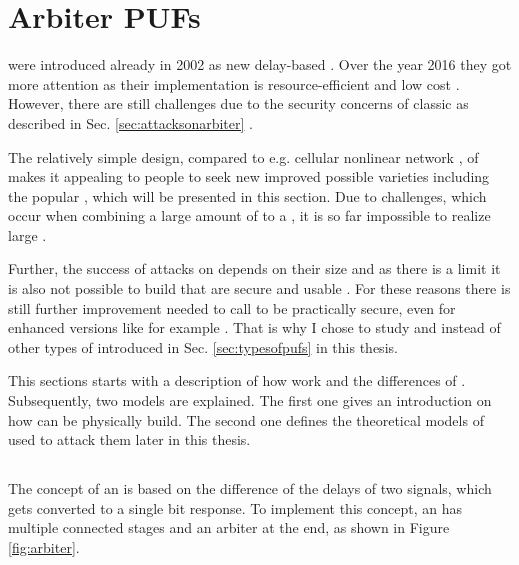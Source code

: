 \chapter{Arbiter \acsp{PUF}}
\label{cap:arbiter}

\apufs were introduced already in 2002 as new delay-based \puf \cite{Gassend2002SiliconFunctions}.
Over the year 2016 they got more attention as their implementation is resource-efficient and low cost \cite{Becker2014ActiveDesigns,Suh2007PhysicalGeneration}.
However, there are still challenges due to the security concerns of classic \apufs as described in Sec. \ref{sec:attacksonarbiter} \cite{Ganji2016PACPUFs, Ruhrmair2014PUFOverview}.

The relatively simple design, compared to e.g. cellular nonlinear network \pufs, of \apufs makes it appealing to people to seek new improved possible varieties including the popular \xpuf, which will be presented in this section. %
Due to challenges, which occur when combining a large amount of \apufs to a \xpufs, it is so far impossible to realize large \xpufs \cite{Rostami2014RobustMatching}.

Further, the success of attacks on \xpufs depends on their size and as there is a limit it is also not possible to build \xpufs that are secure and usable \cite{Ganji2015WhyPUFs}. %
For these reasons there is still further improvement needed to call \apufs to be practically secure, even for enhanced versions like for example \xpufs.
That is why I chose to study \apufs and \xpufs instead of other types of \pufs introduced in Sec. \ref{sec:typesofpufs} in this thesis.

This sections starts with a description of how \apufs work and the differences of \xpufs.
Subsequently, two models are explained. %
The first one gives an introduction on how \apufs can be physically build.
The second one defines the theoretical models of \apufs used to attack them later in this thesis.

\section{\apufs}
\label{sec:arbiter}

The concept of an \apufs is based on the difference of the delays of two signals, which gets converted to a single bit response. 
To implement this concept, an \apuf has multiple connected stages and an arbiter at the end, as shown in Figure \ref{fig:arbiter}.

